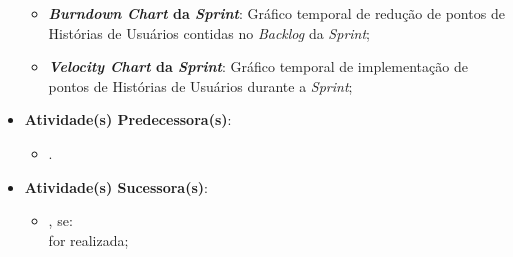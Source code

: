 \begin{itemize}
{						\begin{itemize}
							\item{\textbf{\emph{Burndown Chart} da \emph{Sprint}}: Gráfico temporal de redução de pontos de Histórias de Usuários contidas no \emph{Backlog} da \emph{Sprint};}
							\item{\textbf{\emph{Velocity Chart} da \emph{Sprint}}: Gráfico temporal de implementação de pontos de Histórias de Usuários durante a \emph{Sprint};}
						\end{itemize}}
					\item{\textbf{Atividade(s) Predecessora(s)}:
						\begin{itemize}
							\item{.}
						\end{itemize}}
					\item{\textbf{Atividade(s) Sucessora(s)}:
						\begin{itemize}
							\item{, se:
								\\  for realizada;}
						\end{itemize}}
				\end{itemize}

